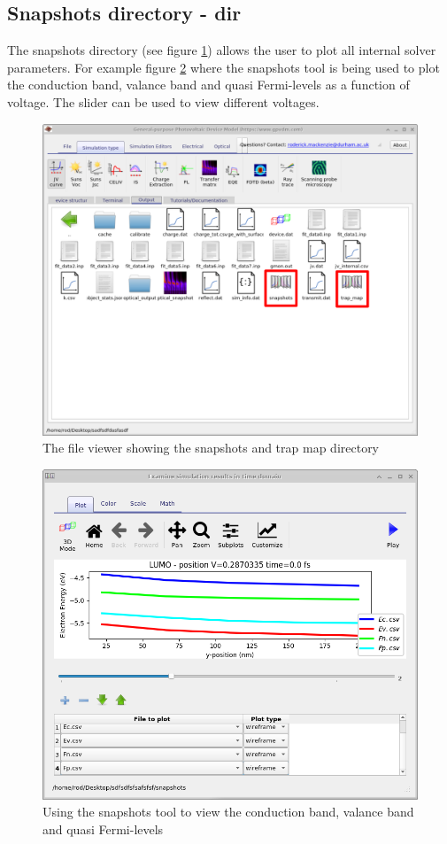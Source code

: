 \subsection{Snapshots directory - dir}
\label{sec:snapshots}
The snapshots directory (see figure \ref{fig:fileviewer}) allows the user to plot all internal solver parameters.  For example figure \ref{fig:snapshots} where the snapshots tool is being used to plot the conduction band, valance band and quasi Fermi-levels as a function of voltage.  The slider can be used to view different voltages.

\begin{figure}[H]
\centering
\includegraphics[width=\textwidth,height=0.7\textwidth]{./images/snapshots.png}
\caption{The file viewer showing the snapshots and trap map directory}
\label{fig:fileviewer}
\end{figure}

\begin{figure}[H]
\centering
\includegraphics[width=\textwidth,height=0.7\textwidth]{./images/snapshot_viewer.png}
\caption{Using the snapshots tool to view the conduction band, valance band and quasi Fermi-levels}
\label{fig:snapshots}
\end{figure}

